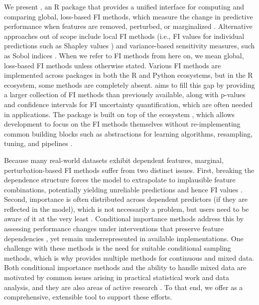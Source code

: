 We present , an R package that provides a unified interface for computing and comparing global, loss-based FI methods, which measure the change in predictive performance when features are removed, perturbed, or marginalized \citep{ewald2024guidefeatureb}.
Alternative approaches out of scope include local FI methods (i.e., FI values for individual predictions such as Shapley values \citep[see][]{shapley1953value, rozemberczki2022shapleyvalue}) and variance-based sensitivity measures, such as Sobol indices \citep{sobol2001globalsensitivitya}.
When we refer to FI methods from here on, we mean global, loss-based FI methods unless otherwise stated.
Various FI methods are implemented across packages in both the R and Python ecosystems, but in the R ecosystem, some methods are completely absent.
 aims to fill this gap by providing a larger collection of FI methods than previously available, along with p-values and confidence intervals for FI uncertainty quantification, which are often needed in applications.
The package is built on top of the  ecosystem \citep{lang2019mlr3moderna}, which allows development to focus on the FI methods themselves without re-implementing common building blocks such as abstractions for learning algorithms, resampling, tuning, and pipelines \citep{binder2021mlr3pipelinesflexible}.

Because many real-world datasets exhibit dependent features, marginal, perturbation-based FI methods suffer from two distinct issues.
First, breaking the dependence structure forces the model to extrapolate to implausible feature combinations, potentially yielding unreliable predictions and hence FI values \citep{hooker2021unrestrictedpermutationb}.
Second, importance is often distributed across dependent predictors (if they are reflected in the model), which is not necessarily a problem, but users need to be aware of it at the very least \citep{nicodemus2010behaviour, debeer2020conditionalpermutation}.
Conditional importance methods address this by assessing performance changes under interventions that preserve feature dependencies \citep{watson2021testingconditional}, yet remain underrepresented in available implementations.
One challenge with these methods is the need for suitable conditional sampling methods, which is why  provides multiple methods for continuous and mixed data.
Both conditional importance methods and the ability to handle mixed data are motivated by common issues arising in practical statistical work and data analysis, and they are also areas of active research \citep[see also][]{blesch2024conditionalfeature, redelmeier2020explainingpredictive}.
To that end, we offer  as a comprehensive, extensible tool to support these efforts.

